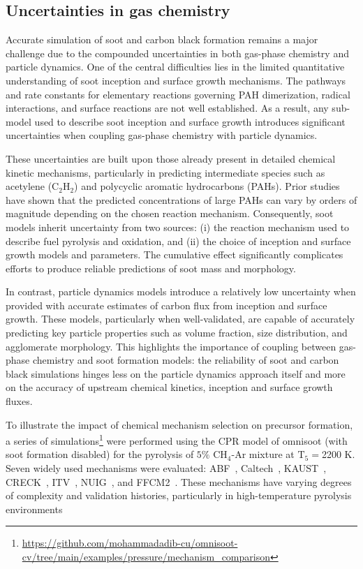 \subsection{Uncertainties in gas chemistry}
Accurate simulation of soot and carbon black formation remains a major challenge due to the compounded uncertainties in both gas-phase chemistry and particle dynamics. One of the central difficulties lies in the limited quantitative understanding of soot inception and surface growth mechanisms. The pathways and rate constants for elementary reactions governing PAH dimerization, radical interactions, and surface reactions are not well established. As a result, any sub-model used to describe soot inception and surface growth introduces significant uncertainties when coupling gas-phase chemistry with particle dynamics.

These uncertainties are built upon those already present in detailed chemical kinetic mechanisms, particularly in predicting intermediate species such as acetylene ($\mathrm{C_2H_2}$) and polycyclic aromatic hydrocarbons (PAHs). Prior studies have shown that the predicted concentrations of large PAHs can vary by orders of magnitude depending on the chosen reaction mechanism. Consequently, soot models inherit uncertainty from two sources: (i) the reaction mechanism used to describe fuel pyrolysis and oxidation, and (ii) the choice of inception and surface growth models and parameters. The cumulative effect significantly complicates efforts to produce reliable predictions of soot mass and morphology.

In contrast, particle dynamics models introduce a relatively low uncertainty when provided with accurate estimates of carbon flux from inception and surface growth. These models, particularly when well-validated, are capable of accurately predicting key particle properties such as volume fraction, size distribution, and agglomerate morphology. This highlights the importance of coupling between gas-phase chemistry and soot formation models: the reliability of soot and carbon black simulations hinges less on the particle dynamics approach itself and more on the accuracy of upstream chemical kinetics, inception and surface growth fluxes.

To illustrate the impact of chemical mechanism selection on precursor formation, a series of simulations\footnote{\href{https://github.com/mohammadadib-cu/omnisoot-cv/tree/main/examples/pressure/mechanism_comparison}{https://github.com/mohammadadib-cu/omnisoot-cv/tree/main/examples/pressure/mechanism\_comparison}} were performed using the CPR model of omnisoot (with soot formation disabled) for the pyrolysis of $5\%$ $\mathrm{CH_4}$-Ar mixture at $\mathrm{T_5}=$2200 K. Seven widely used mechanisms were evaluated: ABF~\citep{appel2000kinetic}, Caltech~\citep{blanquart2009chemical}, KAUST~\citep{wang2013pah}, CRECK~\citep{saggese2015kinetic}, ITV~\citep{hellmuth2024role}, NUIG~\citep{zhu2023wide}, and FFCM2~\citep{ZDV2023}. These mechanisms have varying degrees of complexity and validation histories, particularly in high-temperature pyrolysis environments


